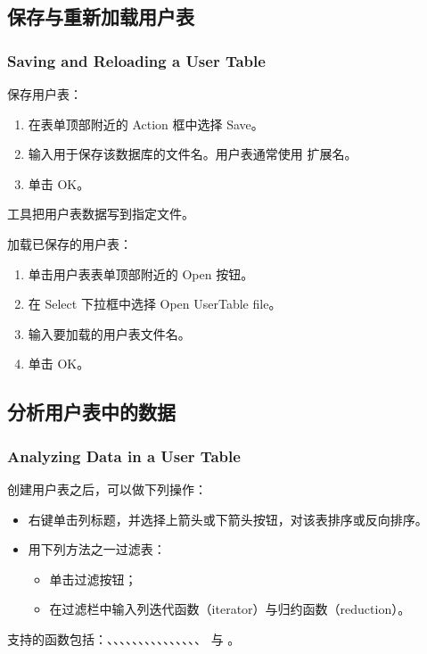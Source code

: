 \subsection{保存与重新加载用户表}
\subsubsection*{Saving and Reloading a User Table}

保存用户表：
\begin{enumerate}
  \item 在表单顶部附近的 Action 框中选择 Save。
  \item 输入用于保存该数据库的文件名。用户表通常使用  扩展名。
  \item 单击 OK。
\end{enumerate}

工具把用户表数据写到指定文件。

加载已保存的用户表：
\begin{enumerate}
  \item 单击用户表表单顶部附近的 Open 按钮。
  \item 在 Select 下拉框中选择 Open UserTable file。
  \item 输入要加载的用户表文件名。
  \item 单击 OK。
\end{enumerate}

\subsection{分析用户表中的数据}
\subsubsection*{Analyzing Data in a User Table}

创建用户表之后，可以做下列操作：
\begin{itemize}
  \item 右键单击列标题，并选择上箭头或下箭头按钮，对该表排序或反向排序。
  \item 用下列方法之一过滤表：
  \begin{itemize}
    \item 单击过滤按钮；
    \item 在过滤栏中输入列迭代函数（iterator）与归约函数（reduction）。
  \end{itemize}
\end{itemize}

支持的函数包括：、、、、、、、、、、、、、、、 与 。

